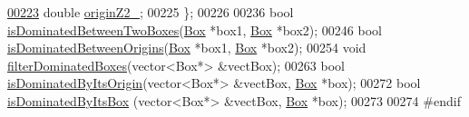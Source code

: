 \begin{DoxyCode}
\hypertarget{Box_8hpp_source_l00223}{}\hyperlink{classBox_a92db5d83336e00813c4131d52e12a1b9}{00223}     \textcolor{keywordtype}{double} \hyperlink{classBox_a92db5d83336e00813c4131d52e12a1b9}{originZ2_};
00225 \};
00226 
00236 \textcolor{keywordtype}{bool} \hyperlink{Box_8cpp_ada27264850e8a9b61d4833a1a9bc5ca7}{isDominatedBetweenTwoBoxes}(\hyperlink{classBox}{Box} *box1, \hyperlink{classBox}{Box} *box2);
00246 \textcolor{keywordtype}{bool} \hyperlink{Box_8cpp_a75b3d174ae55517797459916d5bc07ef}{isDominatedBetweenOrigins}(\hyperlink{classBox}{Box} *box1, \hyperlink{classBox}{Box} *box2);
00254 \textcolor{keywordtype}{void} \hyperlink{Box_8cpp_af9d038887f617a766f86d8a4f0e8d55e}{filterDominatedBoxes}(vector<Box*> &vectBox);
00263 \textcolor{keywordtype}{bool} \hyperlink{Box_8cpp_a57b4536cd76dabffd7326328a2be4b4b}{isDominatedByItsOrigin}(vector<Box*> &vectBox, \hyperlink{classBox}{Box} *box);
00272 \textcolor{keywordtype}{bool} \hyperlink{Box_8cpp_ac8a6e3cd3d38d463bb650ceb4ae88497}{isDominatedByItsBox}   (vector<Box*> &vectBox, \hyperlink{classBox}{Box} *box);
00273 
00274 \textcolor{preprocessor}{#endif}
\end{DoxyCode}

